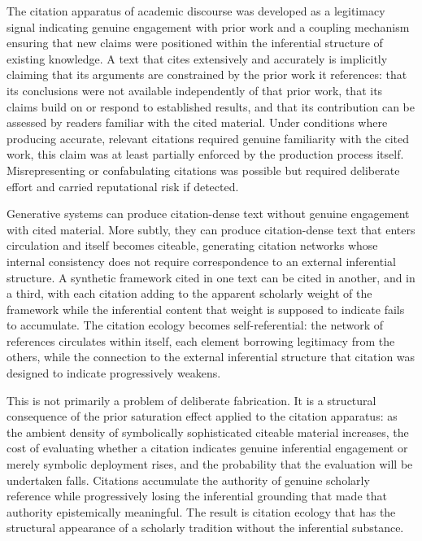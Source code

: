 \documentclass[12pt, openright, twoside]{book}
\begin{document}
The citation apparatus of academic discourse was developed as a
legitimacy signal indicating genuine engagement with prior work and
a coupling mechanism ensuring that new claims were positioned within
the inferential structure of existing knowledge. A text that cites
extensively and accurately is implicitly claiming that its arguments
are constrained by the prior work it references: that its conclusions
were not available independently of that prior work, that its
claims build on or respond to established results, and that its
contribution can be assessed by readers familiar with the cited
material. Under conditions where producing accurate, relevant
citations required genuine familiarity with the cited work, this
claim was at least partially enforced by the production process
itself. Misrepresenting or confabulating citations was possible
but required deliberate effort and carried reputational risk if
detected.

Generative systems can produce citation-dense text without genuine
engagement with cited material. More subtly, they can produce
citation-dense text that enters circulation and itself becomes
citeable, generating citation networks whose internal consistency
does not require correspondence to an external inferential
structure. A synthetic framework cited in one text can be cited
in another, and in a third, with each citation adding to the
apparent scholarly weight of the framework while the inferential
content that weight is supposed to indicate fails to accumulate.
The citation ecology becomes self-referential: the network of
references circulates within itself, each element borrowing
legitimacy from the others, while the connection to the external
inferential structure that citation was designed to indicate
progressively weakens.

This is not primarily a problem of deliberate fabrication. It is
a structural consequence of the prior saturation effect applied
to the citation apparatus: as the ambient density of symbolically
sophisticated citeable material increases, the cost of evaluating
whether a citation indicates genuine inferential engagement or
merely symbolic deployment rises, and the probability that the
evaluation will be undertaken falls. Citations accumulate the
authority of genuine scholarly reference while progressively
losing the inferential grounding that made that authority
epistemically meaningful. The result is citation ecology that
has the structural appearance of a scholarly tradition without
the inferential substance.
\end{document}
